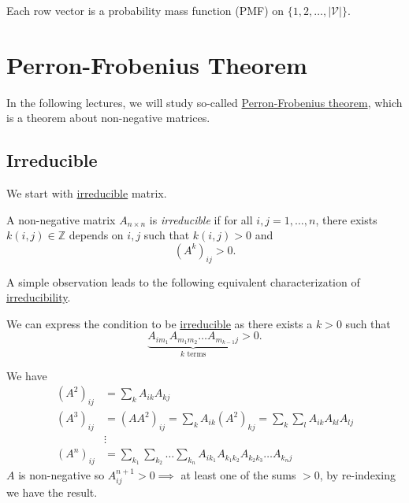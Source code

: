 \begin{remark}
	Each row vector is a probability mass function (PMF) on \(\{1, 2, \dots , \left\vert \mathcal{V}  \right\vert \}\).
\end{remark}

\section{Perron-Frobenius Theorem}
In the following lectures, we will study so-called \hyperref[thm:Perron-Frobenius-theorem]{Perron-Frobenius theorem}, which is a theorem about non-negative matrices.
\subsection{Irreducible}
We start with \hyperref[def:irreducible]{irreducible} matrix.

\begin{definition}[Irreducible]\label{def:irreducible}
	A non-negative matrix \(A_{n\times n}\) is \emph{irreducible} if for all \(i, j = 1, \dots , n\), there exists \(k(i, j)\in \mathbb{Z} \)
	depends on \(i, j\) such that \(k(i, j) > 0\) and
	\[
		(A^k)_{ij}>0.
	\]
\end{definition}

A simple observation leads to the following equivalent characterization of \hyperref[def:irreducible]{irreducibility}.

\begin{remark}
	We can express the condition to be \hyperref[def:irreducible]{irreducible} as there exists a \(k > 0\) such that
	\[
		\underbrace{A_{im_1} A_{m_{1}m_2} \dots A_{m_{k-1}j}}_{k\text{ terms}}>0.
	\]
\end{remark}
\begin{explanation}
	We have
	\[
		\begin{split}
			(A^2)_{ij} &= \sum\limits_{k} A_{ik}A_{kj}\\
			(A^3)_{ij} &= (A A^2)_{ij} = \sum\limits_{k} A_{ik}(A^2)_{kj} = \sum\limits_{k}\sum\limits_{l} A_{ik} A_{kl}A_{lj}\\
			&\vdots\\
			(A^n)_{ij} &= \sum\limits_{k_1}\sum\limits_{k_2}\dots \sum\limits_{k_n}A_{ik_1}A_{k_1 k_2}A_{k_2 k_3}\dots A_{k_n j}
		\end{split}
	\]
	\(A\) is non-negative so \(A^{n+1}_{ij} > 0\implies \) at least one of the sums \(>0\), by re-indexing we have the result.
\end{explanation}

